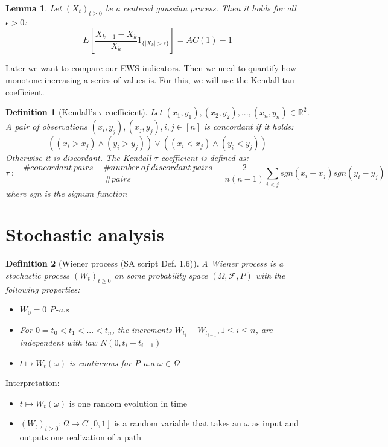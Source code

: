 \documentclass[%
thesis=student,%
coverpage=false,%
titlepage=false,%
headmarks=true, %
english,%
font=libertine, %
math=newpxtx, %
BCOR=5mm,%
coverBCOR=11mm%
]{tumbook}
\newtheorem{definition}{Definition}[section]
\newtheorem{lemma}{Lemma}
\begin{document}
\begin{lemma}
    Let $(X_{t})_{t\geq 0}$ be a centered gaussian process. Then it holds for all $\epsilon > 0$:
    \[
    E[\frac{X_{k+1}-X_{k}}{X_{k}}1_{\{\lvert X_{k} \rvert > \epsilon\}}] = AC(1) - 1
    \]
\end{lemma} 

Later we want to compare our EWS indicators. Then we need to quantify how monotone increasing a series of values is. For this, we will use the Kendall tau coefficient. 

\begin{definition}[Kendall's $\tau$ coefficient]
\label{def:Kendall tau}
Let $(x_{1},y_{1}),(x_{2},y_{2}),...,(x_{n},y_{n})\in \mathbb{R}^{2}$. A pair of observations $(x_{i},y_{j}),(x_{j},y_{j}), i,j \in [n]$ is concordant if it holds:
\[
((x_{i} > x_{j}) \wedge (y_{i} > y_{j})) \vee
((x_{i} < x_{j}) \wedge (y_{i} < y_{j}))
\]
Otherwise it is discordant. The Kendall $\tau$ coefficient is defined as:
\[
\tau := \frac{\#concordant\ pairs - \#number\ of\ discordant\ pairs}{\#pairs} = \frac{2}{n(n-1)}\sum_{i<j}sgn(x_{i}-x_{j})sgn(y_{i}-y_{j})
\]
where sgn is the signum function    
\end{definition}


\section{Stochastic analysis}

\begin{definition}[Wiener process (SA script Def. 1.6)]
A Wiener process is a stochastic process $(W_{t})_{t\geq 0}$ on some probability space $(\Omega,\mathcal{F},P)$ with the following properties: 
\begin{itemize}
    \item $W_{0} = 0$ P-a.s
    \item For $0 = t_{0} < t_{1} < ... < t_{n}$, the increments $W_{t_{i}} - W_{t_{i-1}}, 1 \leq i \leq n$, are independent with law $N(0,t_{i}-t_{i-1})$
    \item $t \mapsto W_{t}(\omega)$ is continuous for P-a.a $\omega \in \Omega$
\end{itemize}
\end{definition}

Interpretation: 

\begin{itemize}
    \item $t \mapsto W_{t}(\omega)$ is one random evolution in time
    \item $(W_{t})_{t \geq 0} : \Omega \mapsto C[0,1]$ is a random variable that takes an $\omega$ as input and outputs one realization of a path
\end{itemize}
\end{document}
